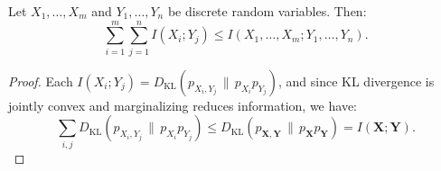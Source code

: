 \documentclass[../../main.tex]{subfiles}
\begin{document}
\begin{theorem}
Let \( X_1, \dots, X_m \) and \( Y_1, \dots, Y_n \) be discrete random variables. Then:
\[
\sum_{i=1}^{m} \sum_{j=1}^{n} I(X_i; Y_j) \leq I(X_1, \dots, X_m; Y_1, \dots, Y_n).
\]
\end{theorem}

\begin{proof}
Each \( I(X_i; Y_j) = D_{\mathrm{KL}}(p_{X_i, Y_j} \,\|\, p_{X_i} p_{Y_j}) \), and since KL divergence is jointly convex and marginalizing reduces information, we have:
\[
\sum_{i,j} D_{\mathrm{KL}}(p_{X_i, Y_j} \,\|\, p_{X_i} p_{Y_j}) \leq D_{\mathrm{KL}}(p_{\mathbf{X}, \mathbf{Y}} \,\|\, p_{\mathbf{X}} p_{\mathbf{Y}}) = I(\mathbf{X}; \mathbf{Y}).
\]
\end{proof}
\end{document}

